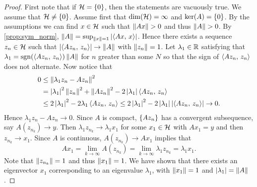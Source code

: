 \begin{proof}
    First note that if $\mathcal{H} = \left\{ {0} \right\}$, then the statements are vacuously true. 
    We assume that $\mathcal{H}\neq\left\{ {0} \right\}$. Assume first that $\dim(\mathcal{H}) = \infty$ and 
    $\ker(A) = \left\{ {0} \right\}$. By the assumptions we can find $x\in\mathcal{H}$ such that 
    $\left\lVert {Ax} \right\rVert>0$ and thus $\left\lVert {A} \right\rVert > 0$. By \cref{prop:sym_norm}, 
    $\left\lVert {A} \right\rVert = \sup_{\left\lVert {x} \right\rVert = 1}\left\lvert {\left\langle {Ax},\, {x} \right\rangle} \right\rvert$. Hence there exists 
    a sequence $z_n\in\mathcal{H}$ such that $\left\lvert {\left\langle {Az_n},\, {z_n} \right\rangle} \right\rvert\to\left\lVert {A} \right\rVert$ 
    with $\left\lVert {z_n} \right\rVert = 1$. Let $\lambda_1\in\mathbb{R}$ satisfying that $\lambda_1 
    = \operatorname{sgn}(\left\langle {Az_n},\, {z_n} \right\rangle)\left\lVert {A} \right\rVert$ for $n$ greater than some $N$ so that the 
    sign of $\left\langle {Az_n},\, {z_n} \right\rangle$ does not alternate. Now notice that 
    \begin{equation*}
        \begin{split}
            0 &\leq \left\lVert {\lambda_1z_n-Az_n} \right\rVert^2 \\
            &= \left\lvert {\lambda_1} \right\rvert^2\left\lVert {z_n} \right\rVert^2 + \left\lVert {Az_n} \right\rVert^2 - 2\left\lvert {\lambda_1} \right\rvert\left\langle {Az_n},\, {z_n} \right\rangle \\
            &\leq 2\left\lvert {\lambda_1} \right\rvert^2 - 2\lambda_1\left\langle {Az_n},\, {z_n} \right\rangle 
            \leq 2\left\lvert {\lambda_1} \right\rvert^2 - 2\left\lvert {\lambda_1} \right\rvert\left\lvert {\left\langle {Az_n},\, {z_n} \right\rangle} \right\rvert \to 0.
        \end{split}
    \end{equation*}
    Hence $\lambda_1z_n - Az_n\to 0$. Since $A$ is compact, $\left\{ {Az_n} \right\}$ has a 
    convergent subsequence, say $A(z_{n_k})\to y$. Then $\lambda_1z_{n_k}\to \lambda_1x_1$ 
    for some $x_1\in\mathcal{H}$ with $Ax_1 = y$ and then $z_{n_k}\to x_1$. Since $A$ 
    is continuous, $A(z_{n_k})\to Ax_1$ implies that
    \begin{equation*}
        Ax_1 = \lim_{k\to\infty} A(z_{n_k}) = \lim_{k\to\infty} \lambda_1z_{n_k} = \lambda_1x_1.
    \end{equation*}
    Note that $\left\lVert {z_{n_k}} \right\rVert = 1$ and thus $\left\lVert {x_1} \right\rVert = 1$. We have shown that
    there exists an eigenvector $x_1$ corresponding to an eigenvalue $\lambda_1$, 
    with $\left\lVert {x_1} \right\rVert = 1$ and $\left\lvert {\lambda_1} \right\rvert = \left\lVert {A} \right\rVert$. 


\end{proof}
